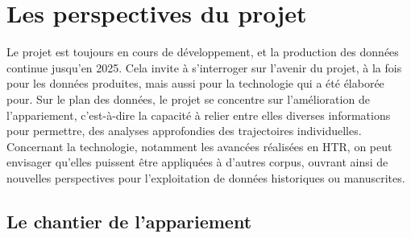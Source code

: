 \chapter{Les perspectives du projet}
Le projet est toujours en cours de développement, et la production des données continue jusqu’en 2025. Cela invite à s’interroger sur l’avenir du projet, à la fois pour les données produites, mais aussi pour la technologie qui a été élaborée pour. Sur le plan des données, le projet se concentre sur l'amélioration de l'appariement, c'est-à-dire la capacité à relier entre elles diverses informations pour permettre, des analyses approfondies des trajectoires individuelles. Concernant la technologie, notamment les avancées réalisées en HTR, on peut envisager qu'elles puissent être appliquées à d'autres corpus, ouvrant ainsi de nouvelles perspectives pour l'exploitation de données historiques ou manuscrites.

    \section{Le chantier de l'appariement}

